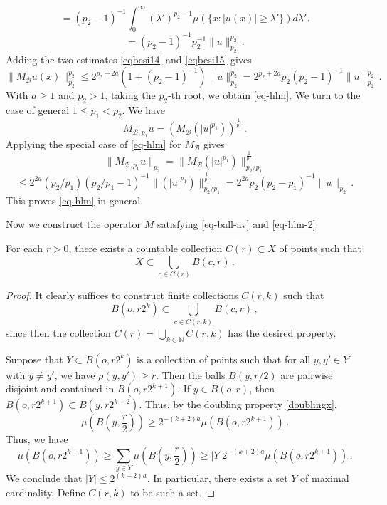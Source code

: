 {\begin{equation}
   =(p_2-1)^{-1}\int_0^\infty (\lambda')^{p_2-1}
     \mu (\{x: |u(x)|\ge \lambda'\})
d\lambda'.
\end{equation}
\begin{equation}\label{eqbesi15}
   =(p_2-1)^{-1} p_2^{-1}\|u\|_{p_2}^{p_2}\, .
\end{equation}
Adding the two estimates
\eqref{eqbesi14} and \eqref{eqbesi15} gives
\begin{equation}
    \|M_{\mathcal{B}}u(x)\|_{p_2}^{p_2}
   \le 2^{p_2+2a} (1+(p_2-1)^{-1})\|u\|_{p_2}^{p_2}
   = 2^{p_2+2a} p_2(p_2-1)^{-1}\|u\|_{p_2}^{p_2}
   \, .
   \end{equation}
With $a\ge 1$ and $p_2>1$, taking the $p_2$-th root, we obtain \eqref{eq-hlm}.
We turn to the case of general
$1\le p_1<p_2$.
We have
\begin{equation}
    M_{\mathcal{B},p_1}u=(M_{\mathcal{B}} (|u|^{p_1}))^{\frac 1{p_1}}\, .
\end{equation}
Applying the special case of \eqref{eq-hlm} for $M_{\mathcal{B}}$ gives
\begin{equation}
    \|M_{\mathcal{B},p_1}u\|_{p_2}=
    \|M_{\mathcal{B}} (|u|^{p_1})\|_{p_2/p_1}^{\frac 1{p_1}}
\end{equation}
\begin{equation}
    \le 2^{2a} (p_2/p_1) (p_2/p_1-1)^{-1}
    \|(|u|^{p_1})\|_{p_2/p_1}^{\frac 1{p_1}}
    =2^{2a} p_2(p_2-p_1)^{-1}\|u\|_{p_2}\, .
\end{equation}
This proves \eqref{eq-hlm} in general.

Now we construct the operator $M$ satisfying \eqref{eq-ball-av} and \eqref{eq-hlm-2}.

\begin{lemma}
    \label{covering-separable-space}
    For each $r > 0$, there exists a countable collection $C(r) \subset X$ of points such that
    $$
        X \subset \bigcup_{c \in C(r)} B(c, r)\,.
    $$
\end{lemma}

\begin{proof}
    It clearly suffices to construct finite collections $C(r,k)$ such that
    $$
        B(o, r2^k) \subset \bigcup_{c \in C(r,k)} B(c,r)\,,
    $$
    since then the collection $C(r) = \bigcup_{k \in \mathbb{N}} C(r,k)$ has the desired property.

    Suppose that $Y \subset B(o, r2^k)$ is a collection of points such that for all $y, y' \in Y$ with $y \ne y'$, we have $\rho(y,y') \ge r$. Then the balls $B(y, r/2)$ are pairwise disjoint and contained in $B(o, r2^{k+1})$. If $y \in B(o, r)$, then $B(o, r2^{k+1}) \subset B(y, r2^{k+2})$. Thus, by the doubling property \eqref{doublingx},
    $$
        \mu(B(y, \frac{r}{2})) \ge 2^{-(k+2)a} \mu(B(o, r2^{k+1}))\,.
    $$
    Thus, we have
    $$
        \mu(B(o, r2^{k+1})) \ge \sum_{y \in Y} \mu(B(y, \frac{r}{2})) \ge |Y| 2^{-(k+2)a} \mu(B(o, r2^{k+1}))\,.
    $$
    We conclude that $|Y| \le 2^{(k+2)a}$. In particular, there exists a set $Y$ of maximal cardinality. Define $C(r,k)$ to be such a set.


\end{proof}}
